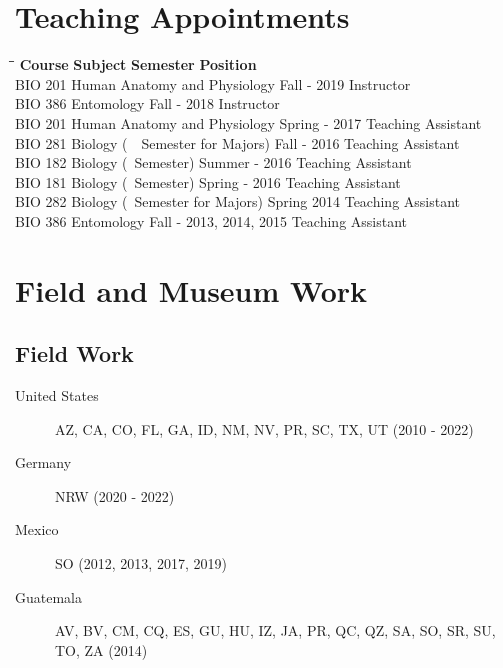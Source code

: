 \documentclass[12pt,a4paper]{article}
\begin{document}
\section*{Teaching Appointments}
	\begin{tabbing}
		\hspace{2cm}\=\hspace{6.5cm}\=\hspace{4cm}\=\kill
		\textbf{Course} \> \textbf{Subject} \> \textbf{Semester} \> \textbf{Position}\\
		BIO 201 \> Human Anatomy and Physiology \> Fall - 2019 \> Instructor \\
		BIO 386 \> Entomology \> Fall - 2018 \> Instructor \\ 
		BIO 201 \> Human Anatomy and Physiology \> Spring - 2017 \> Teaching Assistant \\
		BIO 281 \> Biology (~~Semester for Majors) \> Fall - 2016 \> Teaching Assistant \\
		BIO 182 \> Biology (~Semester) \> Summer - 2016 \> Teaching Assistant \\
		BIO 181 \> Biology (~Semester) \> Spring - 2016 \> Teaching Assistant \\
		BIO 282 \> Biology (~Semester for Majors) \> Spring 2014 \> Teaching Assistant \\
		BIO 386 \> Entomology \> Fall - 2013, 2014, 2015 \> Teaching Assistant
	\end{tabbing} 

\section*{Field and Museum Work}
	\subsection*{Field Work}
		\begin{description}
			\item [United States] \tabto*{3cm} AZ, CA, CO, FL, GA, ID, NM, NV, PR, SC, TX, UT (2010 - 2022)
			\item [Germany] \tabto*{3cm} NRW (2020 - 2022)
			\item [Mexico] \tabto*{3cm} SO (2012, 2013, 2017, 2019)
			\item [Guatemala] \tabto*{3cm} AV, BV, CM, CQ, ES, GU, HU, IZ, JA, PR, QC, QZ, SA, SO, SR, SU, TO, ZA (2014)
		\end{description}
\end{document}
